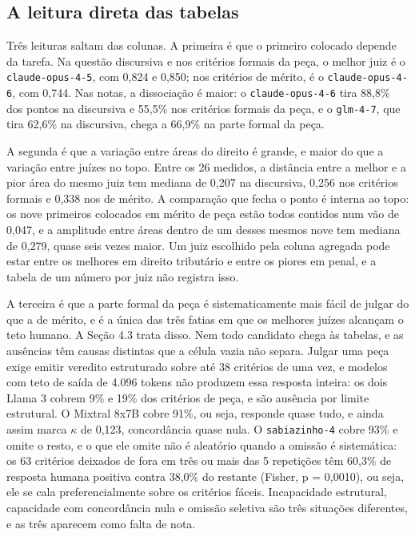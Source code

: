 \documentclass{IOS-Book-Article}
\begin{document}
\subsection{A leitura direta das tabelas}

Três leituras saltam das colunas. A primeira é que o primeiro colocado depende da tarefa. Na questão discursiva e nos critérios formais da peça, o melhor juiz é o \texttt{claude-opus-4-5}, com 0,824 e 0,850; nos critérios de mérito, é o \texttt{claude-opus-4-6}, com 0,744. Nas notas, a dissociação é maior: o \texttt{claude-opus-4-6} tira 88,8\% dos pontos na discursiva e 55,5\% nos critérios formais da peça, e o \texttt{glm-4-7}, que tira 62,6\% na discursiva, chega a 66,9\% na parte formal da peça.

A segunda é que a variação entre áreas do direito é grande, e maior do que a variação entre juízes no topo. Entre os 26 medidos, a distância entre a melhor e a pior área do mesmo juiz tem mediana de 0,207 na discursiva, 0,256 nos critérios formais e 0,338 nos de mérito. A comparação que fecha o ponto é interna ao topo: os nove primeiros colocados em mérito de peça estão todos contidos num vão de 0,047, e a amplitude entre áreas dentro de um desses mesmos nove tem mediana de 0,279, quase seis vezes maior. Um juiz escolhido pela coluna agregada pode estar entre os melhores em direito tributário e entre os piores em penal, e a tabela de um número por juiz não registra isso.

A terceira é que a parte formal da peça é sistematicamente mais fácil de julgar do que a de mérito, e é a única das três fatias em que os melhores juízes alcançam o teto humano. A Seção 4.3 trata disso. Nem todo candidato chega às tabelas, e as ausências têm causas distintas que a célula vazia não separa. Julgar uma peça exige emitir veredito estruturado sobre até 38 critérios de uma vez, e modelos com teto de saída de 4.096 tokens não produzem essa resposta inteira: os dois Llama 3 cobrem 9\% e 19\% dos critérios de peça, e são ausência por limite estrutural. O Mixtral 8x7B cobre 91\%, ou seja, responde quase tudo, e ainda assim marca $\kappa$ de 0,123, concordância quase nula. O \texttt{sabiazinho-4} cobre 93\% e omite o resto, e o que ele omite não é aleatório quando a omissão é sistemática: os 63 critérios deixados de fora em três ou mais das 5 repetições têm 60,3\% de resposta humana positiva contra 38,0\% do restante (Fisher, p = 0,0010), ou seja, ele se cala preferencialmente sobre os critérios fáceis. Incapacidade estrutural, capacidade com concordância nula e omissão seletiva são três situações diferentes, e as três aparecem como falta de nota.
\end{document}
